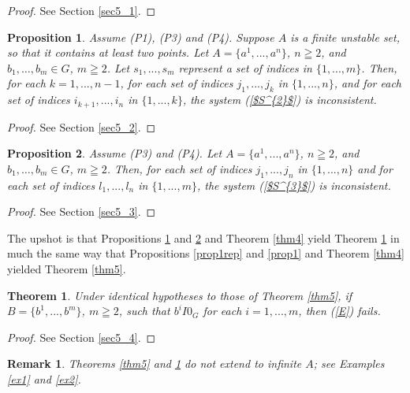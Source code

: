 \documentclass[pdflatex,sn-apa,11pt]{sn-jnl}%
\newtheorem{theorem}{Theorem}%
\newtheorem{proposition}{Proposition}%
\newtheorem{remark}{Remark}%
\begin{document}
\begin{proof}
See Section \ref{sec5_1}.
\end{proof}

\begin{proposition}
\label{prop_revision_1}
Assume (P1), (P3) and (P4). Suppose $A$ is a finite unstable set, so that it contains at least two points. Let $A = \{a^1, ..., a^n\}$, $n \geqq 2$, and $b_1, \dots, b_m \in G$, $m \geqq 2$. Let $s_1, ..., s_m$ represent a set of indices in $\{1, ..., m\}$. Then, for each $k = 1, ..., n-1$, for each set of indices $j_1, ..., j_k$ in $\{1, ..., n\}$, and for each set of indices $i_{k+1}, ..., i_{n}$ in $\{1, ..., k\}$, the system (\ref{$S^{2}$}) is inconsistent.
\end{proposition}

\begin{proof}
See Section \ref{sec5_2}.
\end{proof}

\begin{proposition}
\label{prop_revision_2}
Assume (P3) and (P4). Let $A = \{a^1, ..., a^n\}$, $n \geqq 2$, and $b_1, \dots, b_m \in G$, $m \geqq 2$. Then, for each set of indices $j_1, ..., j_n$ in $\{1, ..., n\}$ and for each set of indices $l_{1}, ..., l_{n}$ in $\{1, ..., m\}$, the system (\ref{$S^{3}$}) is inconsistent.
\end{proposition}

\begin{proof}
See Section \ref{sec5_3}.
\end{proof}

The upshot is that Propositions \ref{prop_revision_1} and \ref{prop_revision_2} and Theorem \ref{thm4} yield Theorem \ref{thm6} in much the same way that Propositions \ref{prop1rep} and \ref{prop1} and Theorem \ref{thm4} yielded Theorem \ref{thm5}.

\begin{theorem}
\label{thm6}
Under identical hypotheses to those of Theorem \ref{thm5}, if $B = \{b^{1}, ..., b^{m}\}$, $m \geqq 2$, such that $b^{i}I0_G$ for each $i = 1, ..., m$, then (\ref{E}) fails.
\end{theorem}

\begin{proof}
See Section \ref{sec5_4}.
\end{proof}

\begin{remark}
\label{rem_thm6}
Theorems \ref{thm5} and \ref{thm6} do not extend to infinite $A$; see Examples \ref{ex1} and \ref{ex2}.
\end{remark}
\end{document}
